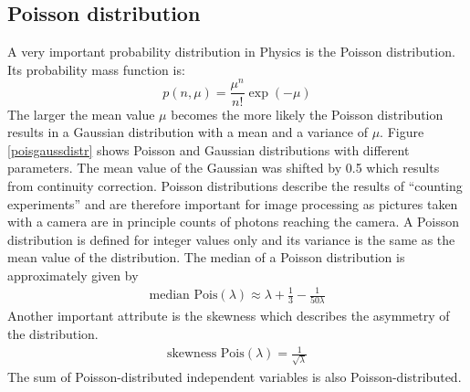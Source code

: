 \subsection{Poisson distribution}
A very important probability distribution in Physics is the Poisson
distribution. Its probability mass function is:
\begin{equation}
	p(n,\mu) = \frac{\mu^n}{n!}\exp(-\mu)
\end{equation}
The larger the mean value $\mu$ becomes the more likely the Poisson distribution results in a Gaussian distribution with a mean and a variance of $\mu$. Figure \ref{poisgaussdistr} shows Poisson and Gaussian distributions with different parameters. The mean value of the Gaussian was shifted by 0.5 which results from continuity correction.\newline
Poisson distributions describe the results of ``counting experiments'' and are
therefore important for image processing as pictures taken with a
camera are in principle counts of photons reaching the camera.  \newline
A Poisson distribution is defined for integer values only and its variance is
the same as the mean value of the distribution.\newline
The median of a Poisson distribution is approximately given by
\begin{align}
	\text{median Pois}(\lambda) \approx \lambda + \frac{1}{3} - \frac{1}{50\lambda} \label{meanMedianPoiss}
\end{align}
Another important attribute is
the skewness which describes the asymmetry of the distribution.
\begin{align}
 \text{skewness Pois}(\lambda) = \frac{1}{\sqrt{\lambda}}
\end{align}
The sum of Poisson-distributed independent variables is also Poisson-distributed.
